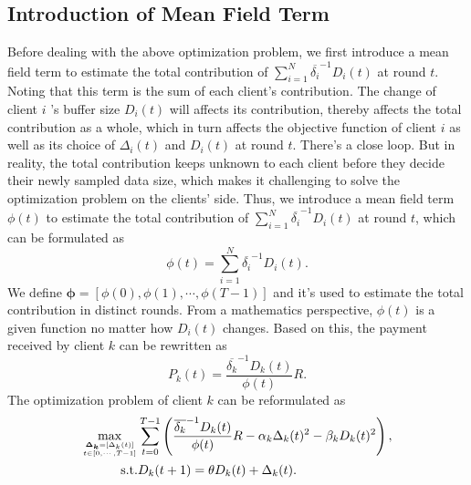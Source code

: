 \documentclass{article}
\theoremstyle{plain}
\theoremstyle{definition}
\theoremstyle{remark}
\begin{document}
\subsection{Introduction of Mean Field Term}
Before dealing with the above optimization problem, we first introduce a mean field term to estimate the total contribution of $\sum_{i=1}^{N}\overline{\delta_i}^{-1}D_i(t)$ at round $t$. 
Noting that this term is the sum of each client's contribution. The change of client $i$ 's buffer size $D_i(t)$ will affects its contribution, thereby affects the total contribution as a whole, which in turn affects the objective function of client $i$ as well as its choice of $\Delta_i(t)$ and $D_i(t)$ at round $t$. There's a close loop.
But in reality, the total contribution keeps unknown to each client before they decide their newly sampled data size, which makes it challenging to solve the optimization problem on the clients' side. 
Thus, we introduce a mean field term $\phi(t)$ to estimate the total contribution of $\sum_{i=1}^{N} \overline{\delta_i}^{-1}D_i(t)$ at round $t$, which can be formulated as
\begin{equation}
  \phi(t) = \sum_{i=1}^{N} \overline{\delta_i}^{-1}D_i(t).
\end{equation}
We define $\boldsymbol{\phi}=[\phi(0), \phi(1), \cdots, \phi(T-1)]$ and it's used to estimate the total contribution in distinct rounds.
From a mathematics perspective, $\phi(t)$ is a given function no matter how $D_i(t)$ changes.
Based on this, the payment received by client $k$ can be rewritten as 
\begin{equation}
  P_k(t) = \frac{\overline{\delta_k}^{-1}D_k(t)}{\phi(t)} R.
\end{equation}
The optimization problem of client $k$ can be reformulated as
\begin{equation}
  \begin{aligned}
    \max_{\boldsymbol{\Delta_k}=[\Delta_k(t)] \atop t \in [0,\cdots,T-1]} & \sum_{t=0}^{T-1} \left(\frac{\overline{\delta_k}^{-1}D_k(t)}{\phi(t)}R - \alpha_k\Delta_k(t)^2 - \beta_kD_k(t)^2\right), \\
    \text{s.t.} & D_k(t+1) = \theta D_k(t) + \Delta_k(t).
  \end{aligned}  
\end{equation}
\end{document}
